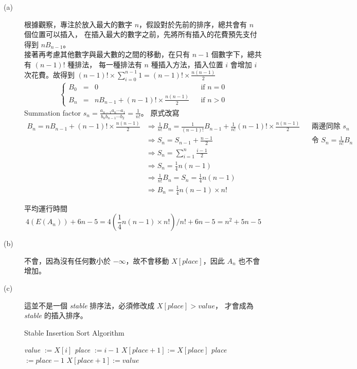 \documentclass[11pt]{article}
\begin{document}
\begin{description}
	\item[(a)] 
		根據觀察，專注於放入最大的數字 $n$，假設對於先前的排序，總共會有 $n$ 個位置可以插入，
		在插入最大的數字之前，先將所有插入的花費預先支付得到 $n B_{n-1}$。 \\
		接著再考慮其他數字與最大數的之間的移動，在只有 $n-1$ 個數字下，總共有 $(n-1)!$ 種排法，
		每一種排法有 $n$ 種插入方法，插入位置 $i$ 會增加 $i$ 次花費。故得到 $(n-1)! \times \sum_{i=0}^{n-1} 1 = (n-1)! \times \frac{n(n-1)}{2}$
		\begin{align*}
			\left\{\begin{matrix}
				B_0 &=& 0 && \text{if } n = 0\\
				B_n &=& n B_{n-1} + (n-1)! \times \frac{n(n-1)}{2} && \text{if } n > 0
			\end{matrix}\right.
		\end{align*}
		Summation factor $s_n = \frac{a_{n-1} a_n \cdots a_1}{b_n b_{n-1} \cdots b_2} = \frac{1}{n!}$。
		原式改寫
		\begin{align*}
			B_n = n B_{n-1} + (n-1)!  \times \frac{n(n-1)}{2}
			&\Rightarrow \frac{1}{n!}B_n = \frac{1}{(n-1)!} B_{n-1} + \frac{1}{n!}(n-1)! 
				\times \frac{n(n-1)}{2} 
				&& \text{兩邊同除 } s_n\\
			&\Rightarrow S_n = S_{n-1} + \frac{n-1}{2} 
				&& \text{令 } S_n = \frac{1}{n!} B_n\\
			&\Rightarrow S_n = \sum_{i=1}^{n} \frac{i-1}{2} \\
			&\Rightarrow S_n = \frac{1}{4} n(n-1) \\
			&\Rightarrow \frac{1}{n!}B_n = S_n = \frac{1}{4} n(n-1) \\
			&\Rightarrow B_n = \frac{1}{4} n(n-1) \times n!
		\end{align*}
		
		平均運行時間 $$4(E(A_n)) + 6n - 5 = 4(\frac{1}{4} n(n-1) \times n!)/n! + 6n - 5 = n^2 + 5n - 5$$
	\item[(b)]
		不會，因為沒有任何數小於 $-\infty$，故不會移動 $X[\textit{place}]$，因此 $A_n$ 也不會增加。
	\item[(c)]
		這並不是一個 \textit{stable} 排序法，必須修改成 $X[\textit{place}] > \textit{value}$，
		才會成為 \textit{stable} 的插入排序。
\begin{algorithm}
  \caption{Stable Insertion Sort Algorithm}\label{insert}
  \begin{algorithmic}[2]
  				
		\State \textit{value} $:= X[i]$		
		\State \textit{place} $:= i-1$		
				
			\State $X[\textit{place}+1] := X[\textit{place}]$	
			\State \textit{place} $:= \textit{place} - 1$	
		\EndWhile
		\State $X[\textit{place}+1] := \textit{value}$	
	\EndFor
  \end{algorithmic}
\end{algorithm}
\end{description}
\end{document}
